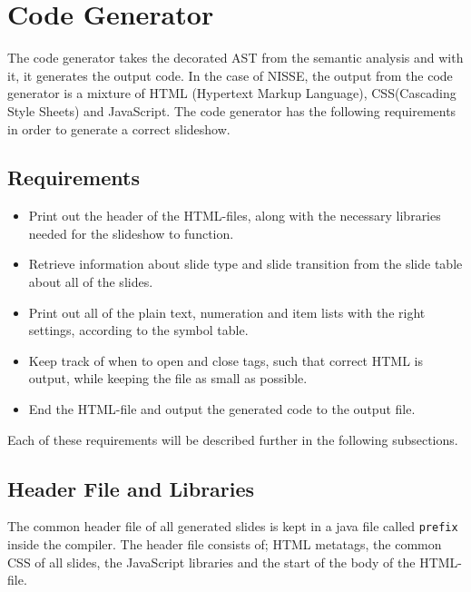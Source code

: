\chapter{Code Generator}

The code generator takes the decorated AST from the semantic analysis and with it, it generates the output code. In the case of NISSE, the output from the code generator is a mixture of HTML (Hypertext Markup Language), CSS(Cascading Style Sheets) and JavaScript. The code generator has the following requirements in order to generate a correct slideshow.

\section{Requirements}
\begin{itemize}
 \item Print out the header of the HTML-files, along with the necessary libraries needed for the slideshow to function.
 \item Retrieve information about slide type and slide transition from the slide table about all of the slides.
 \item Print out all of the plain text, numeration and item lists with the right settings, according to the symbol table.
 \item Keep track of when to open and close tags, such that correct HTML is output, while keeping the file as small as possible.
 \item End the HTML-file and output the generated code to the output file.
\end{itemize}
Each of these requirements will be described further in the following subsections.

\section{Header File and Libraries}
The common header file of all generated slides is kept in a java file called \texttt{prefix} inside the compiler. The header file consists of; HTML metatags, the common CSS of all slides, the JavaScript libraries and the start of the body of the HTML-file. \\

 \\

